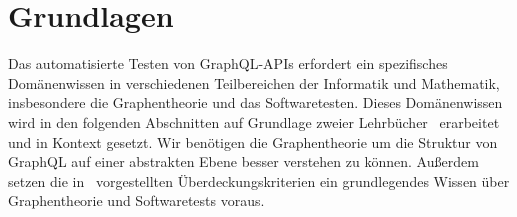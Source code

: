 \chapter{Grundlagen}
\label{theorie}

Das automatisierte Testen von GraphQL-APIs erfordert ein spezifisches Domänenwissen in verschiedenen Teilbereichen der
Informatik und Mathematik, insbesondere die Graphentheorie und das Softwaretesten.
Dieses Domänenwissen wird in den folgenden Abschnitten auf Grundlage zweier Lehrbücher~\cite{software-testing,graphentheorie} erarbeitet
und in Kontext gesetzt.
Wir benötigen die Graphentheorie um die Struktur von GraphQL auf einer abstrakten Ebene besser verstehen zu können.
Außerdem setzen die in~\cite{software-testing} vorgestellten Überdeckungskriterien ein grundlegendes Wissen über Graphentheorie und Softwaretests voraus.

